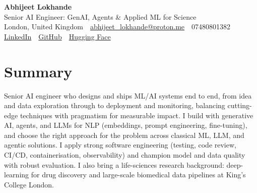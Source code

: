 \documentclass[10pt,a4paper]{article}
\newcommand{\sep}{\,\textcolor{accent!60}{\textbar}\,}
\begin{document}
\begin{center}
  {\fontsize{24}{26}\selectfont\bfseries Abhijeet Lokhande}\\[3pt]
  {\color{accent}\large Senior AI Engineer: GenAI, Agents \& Applied ML for Science}\\[5pt]
  {\small
    London, United Kingdom \sep
    \href{mailto:abhijeet_lokhande@proton.me}{abhijeet\_lokhande@proton.me} \sep
    07480801382 \\[2pt]
    \href{https://www.linkedin.com/in/ablds/}{LinkedIn} \sep
    \href{https://github.com/abhijeetscode}{GitHub} \sep
    \href{https://huggingface.co/ab-ai}{Hugging Face}
  }
\end{center}
\vspace{2pt}

\section{Summary}
Senior AI engineer who designs and ships ML/AI systems end to end, from idea and data exploration through to deployment and monitoring, balancing cutting-edge techniques with pragmatism for measurable impact. I build with generative AI, agents, and LLMs for NLP (embeddings, prompt engineering, fine-tuning), and choose the right approach for the problem across classical ML, LLM, and agentic solutions. I apply strong software engineering (testing, code review, CI/CD, containerisation, observability) and champion model and data quality with robust evaluation. I also bring a life-sciences research background: deep-learning for drug discovery and large-scale biomedical data pipelines at King's College London.

\end{document}
